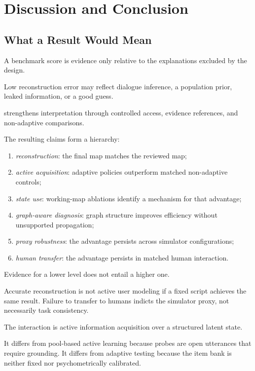 \section{Discussion and Conclusion}
\label{sec:discussion}

\subsection{What a \knowact Result Would Mean}

A benchmark score is evidence only relative to the explanations excluded by the design.

Low reconstruction error may reflect dialogue inference, a population prior, leaked information, or a
good guess.

\knowact strengthens interpretation through controlled access, evidence references, and non-adaptive
comparisons.

The resulting claims form a hierarchy:

\begin{enumerate}[leftmargin=1.7em]
    \item \emph{reconstruction}: the final map matches the reviewed map;
    \item \emph{active acquisition}: adaptive policies outperform matched non-adaptive controls;
    \item \emph{state use}: working-map ablations identify a mechanism for that advantage;
    \item \emph{graph-aware diagnosis}: graph structure improves efficiency without unsupported propagation;
    \item \emph{proxy robustness}: the advantage persists across simulator configurations;
    \item \emph{human transfer}: the advantage persists in matched human interaction.
\end{enumerate}

Evidence for a lower level does not entail a higher one.

Accurate reconstruction is not active user modeling if a fixed script achieves the same result. Failure
to transfer to humans indicts the simulator proxy, not necessarily task consistency.

The interaction is active information acquisition over a structured latent state.

It differs from pool-based active learning because probes are open utterances that require grounding. It
differs from adaptive testing because the item bank is neither fixed nor psychometrically calibrated.


